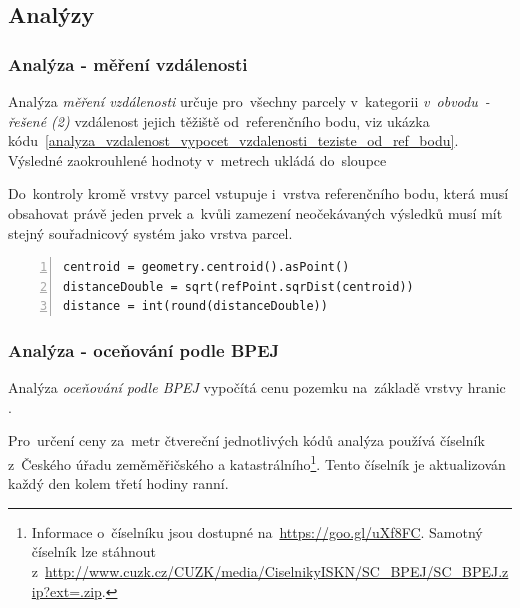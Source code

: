 \subsection{Analýzy}
\label{analyzy}

\subsubsection{Analýza - měření vzdálenosti}
\label{analyza_vzdalenosti}

Analýza \textit{měření vzdálenosti} určuje pro~všechny parcely
v~kategorii \textit{v~obvodu~- řešené (2)} vzdálenost jejich těžiště
od~referenčního bodu, viz ukázka
kódu~\ref{analyza_vzdalenost_vypocet_vzdalenosti_teziste_od_ref_bodu}. Výsledné
zaokrouhlené hodnoty v~metrech ukládá do~sloupce
\texttt{}

Do~kontroly kromě vrstvy parcel vstupuje i~vrstva referenčního bodu,
která musí obsahovat právě jeden prvek a~kvůli zamezení neočekávaných
výsledků musí mít stejný souřadnicový systém jako vrstva parcel.

{\scriptsize
\begin{lstlisting}[style=python, caption={Analýza \textit{měření
vzdálenosti}~– výpočet vzdálenosti těžiště\newline od~referenčního
bodu}, captionpos=b,
label=analyza_vzdalenost_vypocet_vzdalenosti_teziste_od_ref_bodu,
backgroundcolor = \color{light-gray}, numbers=left]
centroid = geometry.centroid().asPoint()
distanceDouble = sqrt(refPoint.sqrDist(centroid))
distance = int(round(distanceDouble))
\end{lstlisting}}

\subsubsection{Analýza - oceňování podle BPEJ}
\label{analyza_bpej}

Analýza \textit{oceňování podle BPEJ} vypočítá cenu pozemku na~základě
vrstvy hranic .

Pro~určení ceny za~metr čtvereční jednotlivých kódů  analýza
používá číselník  z~Českého úřadu zeměměřičského a
katastrálního\footnote{Informace o~číselníku jsou dostupné
na~\url{https://goo.gl/uXf8FC}. Samotný číselník lze stáhnout
z~\url{http://www.cuzk.cz/CUZK/media/CiselnikyISKN/SC_BPEJ/SC_BPEJ.zip?ext=.zip}.}. Tento
číselník je aktualizován každý den kolem třetí hodiny ranní.

